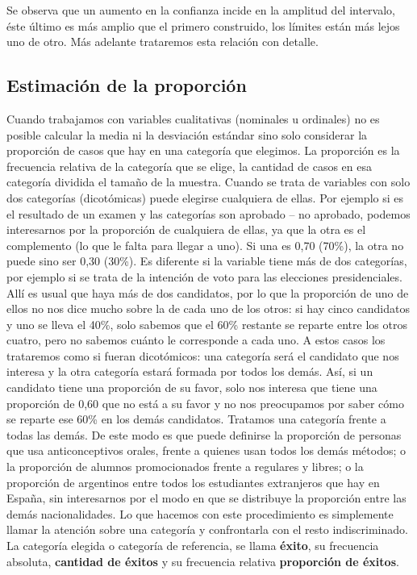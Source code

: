 \documentclass[]{book}
\begin{document}
Se observa que un aumento en la confianza incide en la amplitud del
intervalo, éste último es más amplio que el primero construido, los límites están más lejos uno de otro. Más adelante trataremos esta relación con detalle.

\hypertarget{estimaciuxf3n-de-la-proporciuxf3n}{%
\subsection{Estimación de la proporción}\label{estimaciuxf3n-de-la-proporciuxf3n}}

Cuando trabajamos con variables cualitativas (nominales u ordinales) no
es posible calcular la media ni la desviación estándar sino solo
considerar la proporción de casos que hay en una categoría que elegimos.
La proporción es la frecuencia relativa de la categoría que se elige, la
cantidad de casos en esa categoría dividida el tamaño de la muestra.
Cuando se trata de variables con solo dos categorías (dicotómicas) puede
elegirse cualquiera de ellas. Por ejemplo si es el resultado de un
examen y las categorías son aprobado -- no aprobado, podemos interesarnos
por la proporción de cualquiera de ellas, ya que la otra es el
complemento (lo que le falta para llegar a uno). Si una es 0,70 (70\%),
la otra no puede sino ser 0,30 (30\%). Es diferente si la variable tiene
más de dos categorías, por ejemplo si se trata de la intención de voto
para las elecciones presidenciales. Allí es usual que haya más de dos
candidatos, por lo que la proporción de uno de ellos no nos dice mucho
sobre la de cada uno de los otros: si hay cinco candidatos y uno se
lleva el 40\%, solo sabemos que el 60\% restante se reparte entre los
otros cuatro, pero no sabemos cuánto le corresponde a cada uno. A estos
casos los trataremos como si fueran dicotómicos: una categoría será el
candidato que nos interesa y la otra categoría estará formada por todos
los demás. Así, si un candidato tiene una proporción de su favor, solo
nos interesa que tiene una proporción de 0,60 que no está a su favor y
no nos preocupamos por saber cómo se reparte ese 60\% en los demás
candidatos. Tratamos una categoría frente a todas las demás. De este
modo es que puede definirse la proporción de personas que usa
anticonceptivos orales, frente a quienes usan todos los demás métodos; o
la proporción de alumnos promocionados frente a regulares y libres; o la
proporción de argentinos entre todos los estudiantes extranjeros que hay
en España, sin interesarnos por el modo en que se distribuye la
proporción entre las demás nacionalidades. Lo que hacemos con este
procedimiento es simplemente llamar la atención sobre una categoría y
confrontarla con el resto indiscriminado. La categoría elegida o
categoría de referencia, se llama \textbf{éxito}, su frecuencia absoluta,
\textbf{cantidad de éxitos} y su frecuencia relativa \textbf{proporción de éxitos}.
\end{document}
